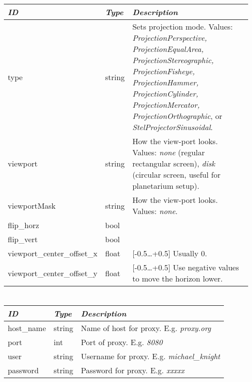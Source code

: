 \begin{longtabu} to \textwidth {l|l|X}\toprule
\emph{ID} & \emph{Type} & \emph{Description}\\\midrule
type & string & Sets projection mode. Values: \emph{ProjectionPerspective,
                ProjectionEqualArea, ProjectionStereographic, ProjectionFisheye,
                ProjectionHammer, ProjectionCylinder, ProjectionMercator,
                ProjectionOrthographic}, or \emph{StelProjectorSinusoidal}.\\\midrule
viewport & string & How the view-port looks. Values: \emph{none} (regular rectangular screen), 
                    \emph{disk} (circular screen, useful for planetarium setup).\\\midrule
viewportMask & string & How the view-port looks. Values: \emph{none}.\\\midrule %
flip\_horz                   & bool & \\\midrule
flip\_vert                   & bool & \\\midrule
viewport\_center\_offset\_x & float & [-0.5\ldots+0.5] Usually 0. \\\midrule
viewport\_center\_offset\_y & float & [-0.5\ldots+0.5] Use negative values to move the horizon lower. \\
\bottomrule
\end{longtabu}

\section{}\label{sec:config.ini:proxy}

\begin{longtabu} to \textwidth {l|l|X}\toprule
\emph{ID}  & \emph{Type} & \emph{Description}\\\midrule
host\_name & string & Name of host for proxy. E.g. \emph{proxy.org}\\\midrule
port       & int    & Port of proxy. E.g. \emph{8080}\\\midrule
user       & string & Username for proxy. E.g. \emph{michael\_knight}\\\midrule
password   & string & Password for proxy. E.g. \emph{xxxxx}\\\bottomrule
\end{longtabu}

